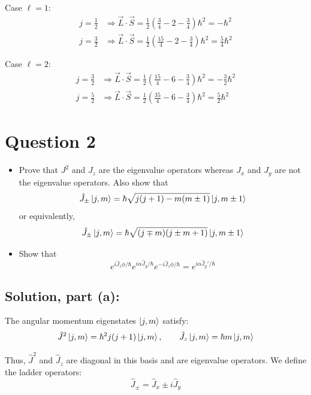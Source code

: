 \documentclass[12pt]{article}
\begin{document}
        Case \( \ell = 1 \):
        \[
            \begin{aligned}
                j = \frac{1}{2} &\Rightarrow \vec{L} \cdot \vec{S} = \frac{1}{2} \left( \frac{3}{4} - 2 - \frac{3}{4} \right) \hbar^2 = -\hbar^2 \\
                j = \frac{3}{2} &\Rightarrow \vec{L} \cdot \vec{S} = \frac{1}{2} \left( \frac{15}{4} - 2 - \frac{3}{4} \right) \hbar^2 = \frac{5}{4} \hbar^2
            \end{aligned}
        \]
        
        Case \( \ell = 2 \):
        \[
            \begin{aligned}
                j = \frac{3}{2} &\Rightarrow \vec{L} \cdot \vec{S} = \frac{1}{2} \left( \frac{15}{4} - 6 - \frac{3}{4} \right) \hbar^2 = -\frac{3}{2} \hbar^2 \\
                j = \frac{5}{2} &\Rightarrow \vec{L} \cdot \vec{S} = \frac{1}{2} \left( \frac{35}{4} - 6 - \frac{3}{4} \right) \hbar^2 = \frac{5}{2} \hbar^2
            \end{aligned}
        \]


\section{Question 2}
\begin{itemize}
    \item [(a)] Prove that \( J^2 \) and \( J_z \) are the eigenvalue operators whereas \( J_x \) and \( J_y \) are not the eigenvalue operators. Also show that
    \[
        \hat{J}_{\pm} \ket{j, m} = \hbar \sqrt{j(j+1) - m(m \pm 1)} \ket{j, m \pm 1}
    \]
    or equivalently,
    \[
        \hat{J}_{\pm} \ket{j, m} = \hbar \sqrt{(j \mp m)(j \pm m + 1)} \ket{j, m \pm 1}
    \]
    \item [(b)] Show that
    \[
        e^{i \hat{J}_z \phi / \hbar} e^{i \alpha \hat{J}_y / \hbar} e^{-i \hat{J}_z \phi / \hbar} = e^{i \alpha \hat{J}_y' / \hbar}
    \]
\end{itemize}

    \subsection{Solution, part (a):}
        The angular momentum eigenstates \( \ket{j, m} \) satisfy:
        \[
            \hat{J}^2 \ket{j, m} = \hbar^2 j(j+1) \ket{j, m}, \qquad
            \hat{J}_z \ket{j, m} = \hbar m \ket{j, m}
        \]
        
        Thus, \( \hat{J}^2 \) and \( \hat{J}_z \) are diagonal in this basis and are eigenvalue operators. We define the ladder operators:
        \[
            \hat{J}_\pm = \hat{J}_x \pm i \hat{J}_y
        \]
        
\end{document}
